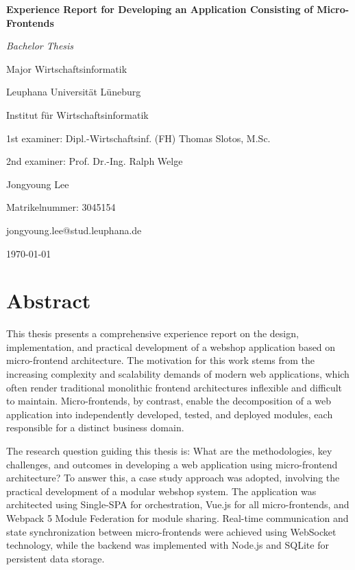 \documentclass[12pt,a4paper]{report}
\begin{document}
\begin{titlepage}
    \centering
    \vspace*{2cm}
    {\Huge\bfseries Experience Report for Developing an Application Consisting of Micro-Frontends\par}
    \vspace{1cm}
    {\Large\itshape Bachelor Thesis\par}
    \vspace{2cm}
    {\large Major Wirtschaftsinformatik\par}
    {\large Leuphana Universität Lüneburg\par}
    {\large Institut für Wirtschaftsinformatik\par}
    \vspace{1cm}
    {\large 1st examiner: Dipl.-Wirtschaftsinf. (FH) Thomas Slotos, M.Sc.\par}
    {\large 2nd examiner: Prof. Dr.-Ing. Ralph Welge\par}
    \vspace{1cm}
    {\Large Jongyoung Lee\par}
    {\large Matrikelnummer: 3045154\par}
    {\large jongyoung.lee@stud.leuphana.de \par}
    \vspace{2cm}
    {\large \today\par}
    \vfill
\end{titlepage}

\chapter*{Abstract}
This thesis presents a comprehensive experience report on the design, implementation, and practical development of a webshop application based on micro-frontend architecture. The motivation for this work stems from the increasing complexity and scalability demands of modern web applications, which often render traditional monolithic frontend architectures inflexible and difficult to maintain. Micro-frontends, by contrast, enable the decomposition of a web application into independently developed, tested, and deployed modules, each responsible for a distinct business domain.

The research question guiding this thesis is: What are the methodologies, key challenges, and outcomes in developing a web application using micro-frontend architecture? To answer this, a case study approach was adopted, involving the practical development of a modular webshop system. The application was architected using Single-SPA for orchestration, Vue.js for all micro-frontends, and Webpack 5 Module Federation for module sharing. Real-time communication and state synchronization between micro-frontends were achieved using WebSocket technology, while the backend was implemented with Node.js and SQLite for persistent data storage.
\end{document}

